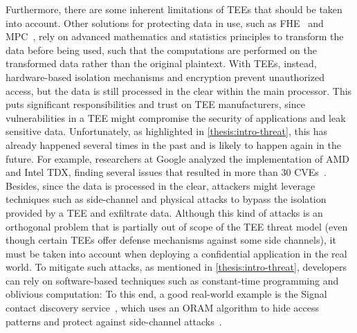 Furthermore, there are some inherent limitations of \acp{TEE} that should be
taken into account. Other solutions for protecting data in use, such as
\ac{FHE}~\cite{acar2018fhe} and \ac{MPC}~\cite{lindell2020mpc}, rely on advanced
mathematics and statistics principles to transform the data before being used,
such that the computations are performed on the transformed data rather than the
original plaintext. With \acp{TEE}, instead, hardware-based isolation mechanisms
and encryption prevent unauthorized access, but the data is still processed in
the clear within the main processor. This puts significant responsibilities and
trust on \ac{TEE} manufacturers, since vulnerabilities in a \ac{TEE} might
compromise the security of applications and leak sensitive data. Unfortunately,
as highlighted in \cref{thesis:intro-threat}, this has already happened several
times in the past and is likely to happen again in the future. For example,
researchers at Google analyzed the implementation of AMD \sevsnp{} and Intel
\ac{TDX}, finding several issues that resulted in more than 30
\acp{CVE}~\cite{securingUnseen}. Besides, since the data is processed in the
clear, attackers might leverage techniques such as side-channel and physical
attacks to bypass the isolation provided by a \ac{TEE} and exfiltrate data.
Although this kind of attacks is an orthogonal problem that is partially out of
scope of the \ac{TEE} threat model (even though certain \acp{TEE} offer defense
mechanisms against some side channels), it must be taken into account when
deploying a confidential application in the real world. To mitigate such
attacks, as mentioned in \cref{thesis:intro-threat}, developers can rely on
software-based techniques such as constant-time programming and oblivious
computation: To this end, a good real-world example is the Signal contact
discovery service~\cite{signalContactDiscoveryOram}, which uses an \ac{ORAM}
algorithm to hide access patterns and protect against side-channel
attacks~\cite{stefanov2018pathoram}.

